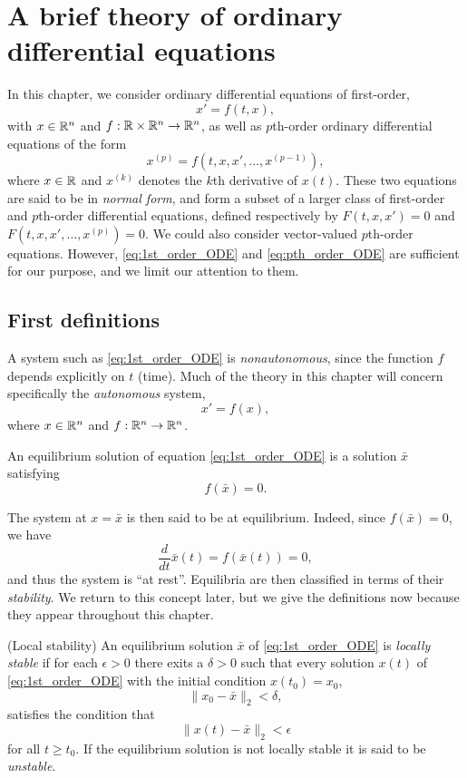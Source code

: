 \chapter{A brief theory of ordinary differential equations}
\label{chap:theory_ode}


In this chapter, we consider ordinary differential equations of first-order,
\begin{equation}\label{eq:1st_order_ODE_nonauton}
x'=f(t,x),
\end{equation}
with $x\in\mathbb{R}^n$ and $f:\mathbb{R}\times\mathbb{R}^n\to\mathbb{R}^n$, as well as $p$th-order ordinary differential equations of the form
\begin{equation}\label{eq:pth_order_ODE}
x^{(p)}=f(t,x,x',\ldots,x^{(p-1)}),
\end{equation}
where $x\in\mathbb{R}$ and $x^{(k)}$ denotes the $k$th derivative of $x(t)$. These two equations are said to be in \emph{normal form}, and form a subset of a larger class of first-order and $p$th-order differential equations, defined respectively by $F(t,x,x')=0$ and $F(t,x,x',\ldots,x^{(p)})=0$. We could also consider vector-valued $p$th-order equations.
However, \eqref{eq:1st_order_ODE} and \eqref{eq:pth_order_ODE} are sufficient for our purpose, and we limit our attention to them.

\section{First definitions}
A system such as \eqref{eq:1st_order_ODE} is \emph{nonautonomous}, since the function $f$ depends explicitly on $t$ (time). Much of the theory in this chapter will concern specifically the \emph{autonomous} system,
\begin{equation}\label{eq:1st_order_ODE}
x'=f(x),
\end{equation}
where $x\in\mathbb{R}^n$ and $f:\mathbb{R}^n\to\mathbb{R}^n$.

\begin{definition}
An equilibrium solution of equation \eqref{eq:1st_order_ODE} is a solution $\bar x$ satisfying 
\[
f(\bar x)=0.
\]
\end{definition}
The system at $x=\bar x$ is then said to be at equilibrium. Indeed, since $f(\bar x)=0$, we have
\[
\frac{d}{dt}\bar x(t)=f(\bar x(t))=0,
\]
and thus the system is ``at rest''. Equilibria are then classified in terms of their \emph{stability}. We return to this concept later, but we give the definitions now because they appear throughout this chapter.
\begin{definition}(Local stability)
An equilibrium solution $\bar x$ of \eqref{eq:1st_order_ODE} is \emph{locally stable} if for each $\epsilon>0$ there exits a $\delta >0$ such that every solution $x(t)$ of \eqref{eq:1st_order_ODE} with the initial condition $x(t_0)=x_0$,
$$\| x_0-\bar x\|_2< \delta,$$
satisfies the condition that
$$\| x(t)-\bar x\|_2< \epsilon$$
for all $t \geq t_0$.
If the equilibrium solution is not locally stable it is said to be \emph{unstable}.
\end{definition}

